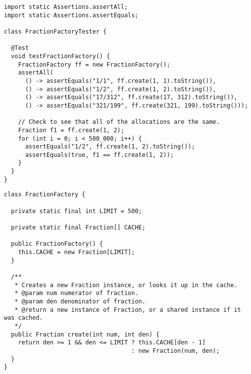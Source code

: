 \begin{cl}{}
\begin{lstlisting}[language=MyJava]
import static Assertions.assertAll;
import static Assertions.assertEquals;

class FractionFactoryTester {

  @Test
  void testFractionFactory() {
    FractionFactory ff = new FractionFactory();
    assertAll(
      () -> assertEquals("1/1", ff.create(1, 1).toString()),
      () -> assertEquals("1/2", ff.create(1, 2).toString()),
      () -> assertEquals("17/312", ff.create(17, 312).toString()),
      () -> assertEquals("321/199", ff.create(321, 199).toString()));

    // Check to see that all of the allocations are the same.
    Fraction f1 = ff.create(1, 2);
    for (int i = 0; i < 500_000; i++) {
      assertEquals("1/2", ff.create(1, 2).toString());
      assertEquals(true, f1 == ff.create(1, 2));
    }
  }
}
\end{lstlisting}
\end{cl}

\begin{cl}{}
\begin{lstlisting}[language=MyJava]
class FractionFactory {

  private static final int LIMIT = 500;
  
  private static final Fraction[] CACHE;

  public FractionFactory() {
    this.CACHE = new Fraction[LIMIT];
  }

  /**
   * Creates a new Fraction instance, or looks it up in the cache.
   * @param num numerator of fraction.
   * @param den denominator of fraction.
   * @return a new instance of Fraction, or a shared instance if it was cached.
   */
  public Fraction create(int num, int den) {
    return den >= 1 && den <= LIMIT ? this.CACHE[den - 1] 
                                    : new Fraction(num, den);
  }
}
\end{lstlisting}
\end{cl}


